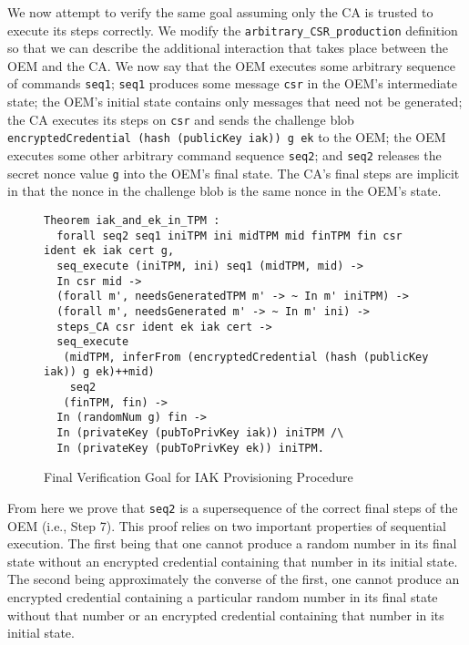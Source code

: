 \documentclass[runningheads]{llncs}
\begin{document}
We now attempt to verify the same goal assuming only the CA is trusted
to execute its steps correctly. 
We modify the \verb|arbitrary_CSR_production| definition 
so that we can describe the additional interaction
that takes place between the OEM and the CA. We now say that
the OEM executes some arbitrary sequence of commands \verb|seq1|;
\verb|seq1| produces some message \verb|csr| in the OEM's intermediate
state; the OEM's initial state contains only messages that need not be
generated; the CA executes its steps on \verb|csr| and sends the
challenge blob \verb|encryptedCredential (hash (publicKey iak)) g ek|
to the OEM; the OEM executes some other arbitrary command sequence \verb|seq2|;
and \verb|seq2| releases the secret nonce value \verb|g| into the OEM's
final state. The CA's final steps are implicit in that the nonce in
the challenge blob is the same nonce in the OEM's state.

\begin{figure}[hptb]
\vspace{-\medskipamount}
\vspace{-\medskipamount}
\begin{lstlisting}[language=Coq]
Theorem iak_and_ek_in_TPM :
  forall seq2 seq1 iniTPM ini midTPM mid finTPM fin csr ident ek iak cert g,
  seq_execute (iniTPM, ini) seq1 (midTPM, mid) -> 
  In csr mid ->
  (forall m', needsGeneratedTPM m' -> ~ In m' iniTPM) ->
  (forall m', needsGenerated m' -> ~ In m' ini) ->
  steps_CA csr ident ek iak cert ->
  seq_execute
   (midTPM, inferFrom (encryptedCredential (hash (publicKey iak)) g ek)++mid)
    seq2 
   (finTPM, fin) ->
  In (randomNum g) fin ->
  In (privateKey (pubToPrivKey iak)) iniTPM /\ 
  In (privateKey (pubToPrivKey ek)) iniTPM.
\end{lstlisting}
\caption{Final Verification Goal for IAK Provisioning Procedure}
\label{fig:iak_goal}
\end{figure}

From here we prove that \verb|seq2| is a supersequence of the correct
final steps of the OEM (i.e., Step 7). This proof relies on two
important properties of sequential execution. The first being that one
cannot produce a random number in its final state without an encrypted
credential containing that number in its initial state. The second
being approximately the converse of the first, one cannot produce an
encrypted credential containing a particular random number in its
final state without that number or an encrypted credential containing
that number in its initial state.
\end{document}
